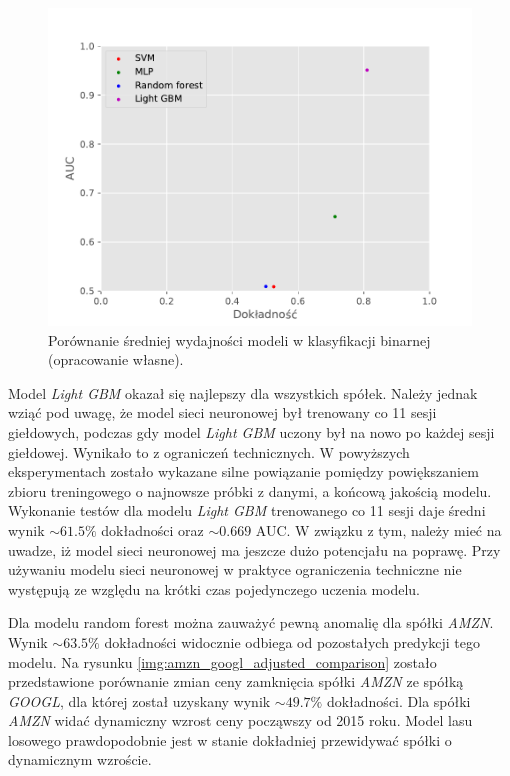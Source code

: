 \documentclass[a4paper, twoside, 11pt, openright]{article}
\begin{document}
\begin{figure}[H]
\centering \includegraphics[scale=0.9]{img/summary-binary-summary.pdf}
\caption{Porównanie średniej wydajności modeli w klasyfikacji binarnej (opracowanie własne).}
\label{img:summary-binary}
\end{figure}

\bigskip

Model \textit{Light GBM} okazał się najlepszy dla wszystkich spółek. Należy jednak wziąć pod uwagę, że model sieci neuronowej był trenowany co 11 sesji giełdowych, podczas gdy model \textit{Light GBM} uczony był na nowo po każdej sesji giełdowej. Wynikało to z ograniczeń technicznych. W powyższych eksperymentach zostało wykazane silne powiązanie pomiędzy powiększaniem zbioru treningowego o najnowsze próbki z danymi, a końcową jakością modelu. Wykonanie testów dla modelu \textit{Light GBM} trenowanego co 11 sesji daje średni wynik $\sim 61.5\%$ dokładności oraz $\sim 0.669$ AUC. W związku z tym, należy mieć na uwadze, iż model sieci neuronowej ma jeszcze dużo potencjału na poprawę. Przy używaniu modelu sieci neuronowej w praktyce ograniczenia techniczne nie występują ze względu na krótki czas pojedynczego uczenia modelu.

\bigskip

Dla modelu random forest można zauważyć pewną anomalię dla spółki \textit{AMZN}. Wynik $\sim 63.5\%$ dokładności widocznie odbiega od pozostałych predykcji tego modelu. Na rysunku \ref{img:amzn_googl_adjusted_comparison} zostało przedstawione porównanie zmian ceny zamknięcia spółki \textit{AMZN} ze spółką \textit{GOOGL}, dla której został uzyskany wynik $\sim 49.7\%$ dokładności. Dla spółki \textit{AMZN} widać dynamiczny wzrost ceny począwszy od 2015 roku. Model lasu losowego prawdopodobnie jest w stanie dokładniej przewidywać spółki o dynamicznym wzroście.
\end{document}
